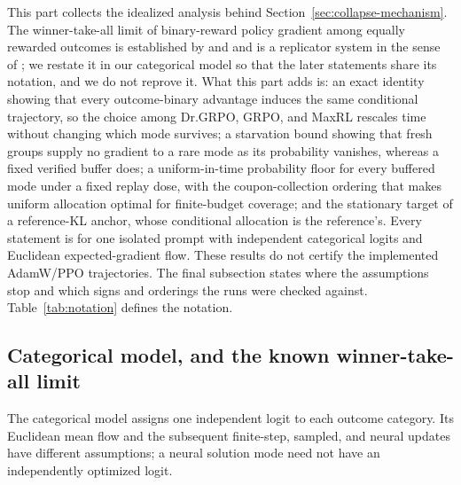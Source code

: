 This part collects the idealized analysis behind
Section~\ref{sec:collapse-mechanism}. The winner-take-all limit of
binary-reward policy gradient among equally rewarded outcomes is established
by \citet{sinha2026expected} and \citet{lochab2026ucpo} and is a replicator
system in the sense of \citet{hofbauer1998evolutionary}; we restate it in our
categorical model so that the later statements share its notation, and we do
not reprove it. What this part adds is: an exact identity showing that every
outcome-binary advantage induces the same conditional trajectory, so the
choice among Dr.GRPO, GRPO, and MaxRL rescales time without changing which
mode survives; a starvation bound showing that fresh groups supply no gradient
to a rare mode as its probability vanishes, whereas a fixed verified buffer
does; a uniform-in-time probability floor for every buffered mode under a
fixed replay dose, with the coupon-collection ordering that makes uniform
allocation optimal for finite-budget coverage; and the stationary target of a
reference-KL anchor, whose conditional allocation is the reference's. Every
statement is for one isolated prompt with independent categorical logits and
Euclidean expected-gradient flow. These results do not certify the
implemented AdamW/PPO trajectories. The final subsection states where the
assumptions stop and which signs and orderings the runs were checked against.
Table~\ref{tab:notation} defines the notation.

\subsection{Categorical model, and the known winner-take-all limit}
\label{app:theory-grpo-mean}
\label{app:theory-collapse}
\label{app:theory-objective-inertness}

The categorical model assigns one independent logit to each outcome
category. Its Euclidean mean flow and the subsequent finite-step, sampled,
and neural updates have different assumptions; a neural solution mode need
not have an independently optimized logit.

